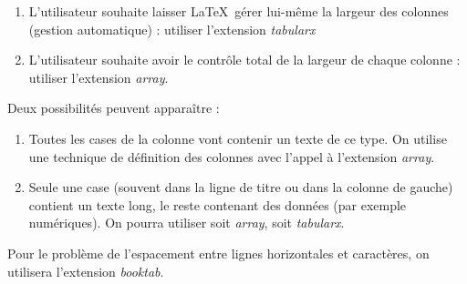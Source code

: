 \begin{enumerate}
\item L'utilisateur souhaite laisser \LaTeX\ gérer lui-même la largeur des
  colonnes (gestion automatique) : utiliser l'extension \emph{tabularx}
\item L'utilisateur souhaite avoir le contrôle total de la largeur de chaque
  colonne : utiliser l'extension \emph{array}.
\end{enumerate}

Deux possibilités peuvent apparaître :
\begin{enumerate}
\item \label{toutes}Toutes les cases de la colonne vont contenir un texte de
  ce type. On utilise une technique de définition des colonnes avec l'appel à
  l'extension \emph{array}.
\item \label{titre}Seule une case (souvent dans la ligne de titre ou
  dans la colonne de gauche) contient un texte long, le reste
  contenant des données (par exemple numériques). On pourra utiliser
  soit \emph{array}, soit \emph{tabularx}.
\end{enumerate}

Pour le problème de l'espacement entre lignes horizontales et
caractères, on utilisera l'extension \emph{booktab}.

\vfill







